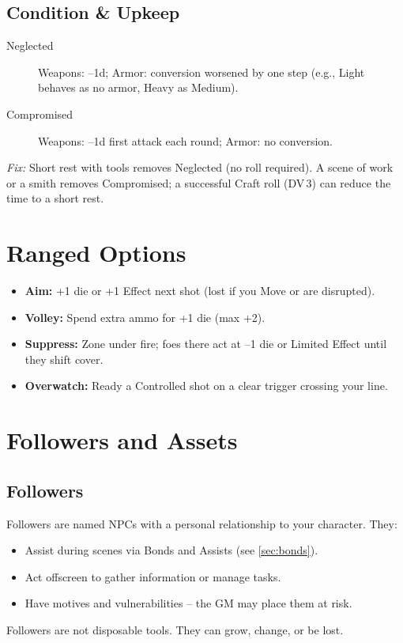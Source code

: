 \subsection{Condition \& Upkeep}
\label{sec:equipment-condition}

\begin{description}
  \item[Neglected] Weapons: –1d; Armor: conversion worsened by one step (e.g., Light behaves as no armor, Heavy as Medium).
  \item[Compromised] Weapons: –1d first attack each round; Armor: no conversion.
\end{description}
\textit{Fix:} Short rest with tools removes Neglected (no roll required). A scene of work or a smith removes Compromised; a successful Craft roll (DV 3) can reduce the time to a short rest.

\section{Ranged Options}
\label{sec:ranged-options}

\begin{itemize}
  \item \textbf{Aim:} +1 die or +1 Effect next shot (lost if you Move or are disrupted).
  \item \textbf{Volley:} Spend extra ammo for +1 die (max +2).
  \item \textbf{Suppress:} Zone under fire; foes there act at –1 die or Limited Effect until they shift cover.
  \item \textbf{Overwatch:} Ready a Controlled shot on a clear trigger crossing your line.
\end{itemize}

\section{Followers and Assets}
\label{sec:followers-assets}

\subsection{Followers}
Followers are named NPCs with a personal relationship to your character. They:
\begin{itemize}
  \item Assist during scenes via Bonds and Assists (see \ref{sec:bonds}).
  \item Act offscreen to gather information or manage tasks.
  \item Have motives and vulnerabilities – the GM may place them at risk.
\end{itemize}
Followers are not disposable tools. They can grow, change, or be lost.

